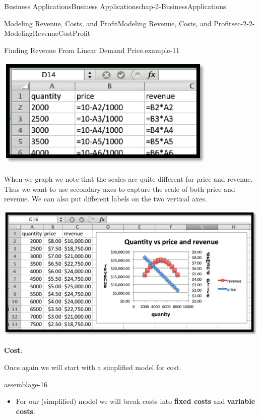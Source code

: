 \documentclass[oneside,10pt,]{book}
\newcommand{\terminology}[1]{\textbf{#1}}
\numberwithin{equation}{section}
\begin{document}
\begin{chapterptx}{Business Applications}{}{Business Applications}{}{}{chap-2-BusinessApplications}
\begin{sectionptx}{Modeling Revenue, Costs, and Profit}{}{Modeling Revenue, Costs, and Profit}{}{}{sec-2-2-ModelingRevenueCostProfit}
\begin{example}{Finding Revenue From Linear Demand Price.}{example-11}
\begin{sidebyside}{1}{0.2}{0.2}{0}
\begin{sbspanel}{0.6}
\includegraphics[width=1\linewidth]{images/sec2-2-3.png}
\end{sbspanel}%
\end{sidebyside}%
\par
\hypertarget{p-643}{}%
When we graph we note that the scales are quite different for price and revenue.  Thus we want to use secondary axes to capture the scale of both price and revenue.  We can also put different labels on the two vertical axes.%
\begin{sidebyside}{1}{0.2}{0.2}{0}%
\begin{sbspanel}{0.6}%
\includegraphics[width=1\linewidth]{images/sec2-2-4.png}
\end{sbspanel}%
\end{sidebyside}%
\end{example}
\hypertarget{p-644}{}%
\terminology{Cost}:%
\par
\hypertarget{p-645}{}%
Once again we will start with a simplified model for cost.%
\begin{assemblage}{}{assemblage-16}%
\hypertarget{p-646}{}%
\leavevmode%
\begin{itemize}[label=\textbullet]
\item{}\hypertarget{p-647}{}%
For our (simplified) model we will break costs into \terminology{fixed costs} and \terminology{variable costs}.%

\end{itemize}
\end{assemblage}
\end{sectionptx}
\end{chapterptx}
\end{document}
